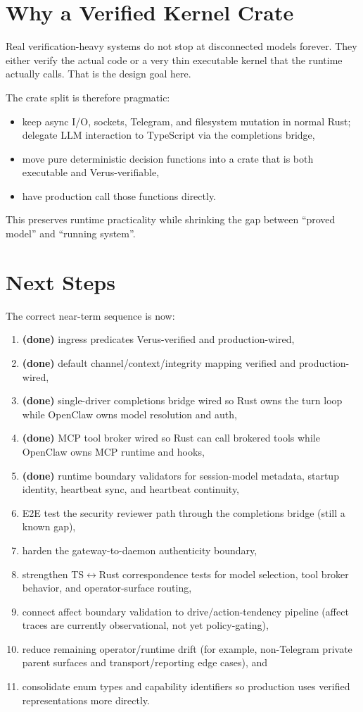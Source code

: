\documentclass[11pt]{article}
\begin{document}
\section{Why a Verified Kernel Crate}
Real verification-heavy systems do not stop at disconnected models forever. They either verify the actual code or a very thin executable kernel that the runtime actually calls. That is the design goal here.

The crate split is therefore pragmatic:
\begin{itemize}[leftmargin=1.5em]
\item keep async I/O, sockets, Telegram, and filesystem mutation in normal Rust; delegate LLM interaction to TypeScript via the completions bridge,
\item move pure deterministic decision functions into a crate that is both executable and Verus-verifiable,
\item have production call those functions directly.
\end{itemize}

This preserves runtime practicality while shrinking the gap between ``proved model'' and ``running system''.

\section{Next Steps}
The correct near-term sequence is now:
\begin{enumerate}[label=\arabic*.]
\item \textbf{(done)} ingress predicates Verus-verified and production-wired,
\item \textbf{(done)} default channel/context/integrity mapping verified and production-wired,
\item \textbf{(done)} single-driver completions bridge wired so Rust owns the turn loop while OpenClaw owns model resolution and auth,
\item \textbf{(done)} MCP tool broker wired so Rust can call brokered tools while OpenClaw owns MCP runtime and hooks,
\item \textbf{(done)} runtime boundary validators for session-model metadata, startup identity, heartbeat sync, and heartbeat continuity,
\item E2E test the security reviewer path through the completions bridge (still a known gap),
\item harden the gateway-to-daemon authenticity boundary,
\item strengthen TS$\leftrightarrow$Rust correspondence tests for model selection, tool broker behavior, and operator-surface routing,
\item connect affect boundary validation to drive/action-tendency pipeline (affect traces are currently observational, not yet policy-gating),
\item reduce remaining operator/runtime drift (for example, non-Telegram private parent surfaces and transport/reporting edge cases), and
\item consolidate enum types and capability identifiers so production uses verified representations more directly.
\end{enumerate}
\end{document}
